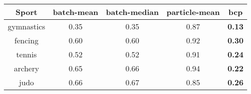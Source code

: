 \begin{tabular}{|c|c|c|c|c|}
\hline
Sport & batch-mean & batch-median & particle-mean & bcp \\
\hline
gymnastics & 0.35 & 0.35 & 0.87 & \textbf{0.13} \\
fencing & 0.60 & 0.60 & 0.92 & \textbf{0.30} \\
tennis & 0.52 & 0.52 & 0.91 & \textbf{0.24} \\
archery & 0.65 & 0.66 & 0.94 & \textbf{0.22} \\
judo & 0.66 & 0.67 & 0.85 & \textbf{0.26} \\
\hline
\end{tabular}
